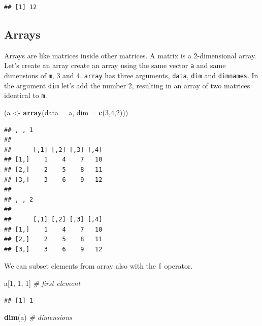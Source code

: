 \documentclass[12pt,graybox,envcountchap,sectrefs]{krantz}
\makeatletter
\newenvironment{Shaded}{\begin{snugshade}}{\end{snugshade}}
\newcommand{\KeywordTok}[1]{\textcolor[rgb]{0.13,0.29,0.53}{\textbf{#1}}}
\newcommand{\DataTypeTok}[1]{\textcolor[rgb]{0.13,0.29,0.53}{#1}}
\newcommand{\DecValTok}[1]{\textcolor[rgb]{0.00,0.00,0.81}{#1}}
\newcommand{\StringTok}[1]{\textcolor[rgb]{0.31,0.60,0.02}{#1}}
\newcommand{\CommentTok}[1]{\textcolor[rgb]{0.56,0.35,0.01}{\textit{#1}}}
\newcommand{\NormalTok}[1]{#1}
\newenvironment{kframe}{%
\medskip{}
\setlength{\fboxsep}{.8em}
 \def\at@end@of@kframe{}%
 \ifinner\ifhmode%
  \def\at@end@of@kframe{\end{minipage}}%
  \begin{minipage}{\columnwidth}%
 \fi\fi%
 \def\FrameCommand##1{\hskip\@totalleftmargin \hskip-\fboxsep
 \colorbox{shadecolor}{##1}\hskip-\fboxsep
     \hskip-\linewidth \hskip-\@totalleftmargin \hskip\columnwidth}%
 \MakeFramed {\advance\hsize-\width
   \@totalleftmargin\z@ \linewidth\hsize
   \@setminipage}}%
 {\par\unskip\endMakeFramed%
 \at@end@of@kframe}
\renewenvironment{Shaded}{\begin{kframe}}{\end{kframe}}
\theoremstyle{definition}
\theoremstyle{definition}
\theoremstyle{definition}
\theoremstyle{remark}
\makeatother
\begin{document}
\begin{verbatim}
## [1] 12
\end{verbatim}

\subsection{Arrays}\label{arrays}

Arrays are like matrices inside other matrices. A matrix is a
2-dimensional array. Let's create an array create an array using the
same vector \texttt{a} and same dimensions of \texttt{m}, 3 and 4.
\texttt{array} has three arguments, \texttt{data}, \texttt{dim} and
\texttt{dimnames}. In the argument \texttt{dim} let's add the number 2,
resulting in an array of two matrices identical to \texttt{m}.

\begin{Shaded}
\begin{Highlighting}[]
\NormalTok{(a <-}\StringTok{ }\KeywordTok{array}\NormalTok{(}\DataTypeTok{data =}\NormalTok{ a, }\DataTypeTok{dim =} \KeywordTok{c}\NormalTok{(}\DecValTok{3}\NormalTok{,}\DecValTok{4}\NormalTok{,}\DecValTok{2}\NormalTok{)))}
\end{Highlighting}
\end{Shaded}

\begin{verbatim}
## , , 1
## 
##      [,1] [,2] [,3] [,4]
## [1,]    1    4    7   10
## [2,]    2    5    8   11
## [3,]    3    6    9   12
## 
## , , 2
## 
##      [,1] [,2] [,3] [,4]
## [1,]    1    4    7   10
## [2,]    2    5    8   11
## [3,]    3    6    9   12
\end{verbatim}

We can subset elements from array also with the \texttt{{[}} operator.

\begin{Shaded}
\begin{Highlighting}[]
\NormalTok{a[}\DecValTok{1}\NormalTok{, }\DecValTok{1}\NormalTok{, }\DecValTok{1}\NormalTok{] }\CommentTok{# first element}
\end{Highlighting}
\end{Shaded}

\begin{verbatim}
## [1] 1
\end{verbatim}

\begin{Shaded}
\begin{Highlighting}[]
\KeywordTok{dim}\NormalTok{(a)     }\CommentTok{# dimensions}
\end{Highlighting}
\end{Shaded}
\end{document}
